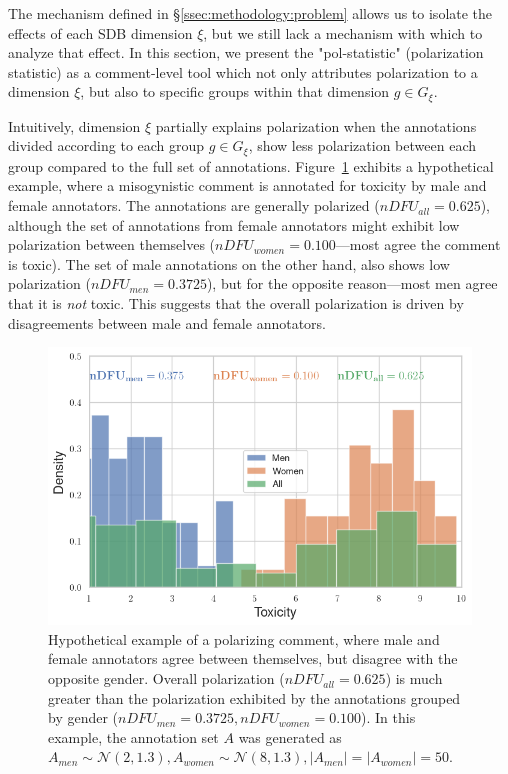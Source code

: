\documentclass{article}
\begin{document}
The mechanism defined in \S\ref{ssec:methodology:problem} allows us to isolate the effects of each \ac{SDB} dimension $\xi$, but we still lack a mechanism with which to analyze that effect. In this section, we present the "pol-statistic" (polarization statistic) as a comment-level tool which not only attributes polarization to a dimension $\xi$, but also to specific groups within that dimension $g \in G_{\xi}$.

Intuitively, dimension $\xi$ partially explains polarization when the annotations divided according to each group $g \in G_{\xi}$, show less polarization between each group compared to the full set of annotations. Figure~\ref{fig:ndfu_single_comment} exhibits a hypothetical example, where a misogynistic comment is annotated for toxicity by male and female annotators. The annotations are generally polarized ($nDFU_{all} = 0.625$), although the set of annotations from female annotators might exhibit low polarization between themselves ($nDFU_{women} = 0.100$---most agree the comment is toxic). The set of male annotations on the other hand, also shows low polarization ($nDFU_{men} = 0.3725$), but for the opposite reason---most men agree that it is \emph{not} toxic. This suggests that the overall polarization is driven by disagreements between male and female annotators. 

\begin{figure}[t]
	\centering
	\includegraphics[width=0.8\linewidth]{ndfu_single_comment.png}
	\caption{Hypothetical example of a polarizing comment, where male and female annotators agree between themselves, but disagree with the opposite gender. Overall polarization ($nDFU_{all} = 0.625$) is much greater than the polarization exhibited by the annotations grouped by gender ($nDFU_{men} = 0.3725, nDFU_{women} = 0.100$). In this example, the annotation set $A$ was generated as $A_{men} \sim \mathcal{N}(2, 1.3), A_{women} \sim \mathcal{N}(8, 1.3), \lvert A_{men} \rvert = \lvert A_{women} \rvert = 50$.}
	\label{fig:ndfu_single_comment}
\end{figure}
\end{document}
